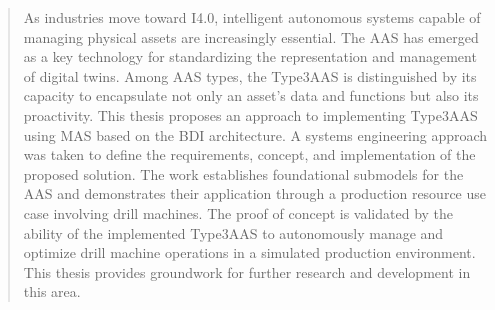 
\begin{abstract}

As industries move toward \ac{I4.0}, intelligent autonomous systems capable of managing physical assets are increasingly essential.
The \ac{AAS} has emerged as a key technology for standardizing the representation and management of digital twins.
Among AAS types, the \ac{Type3AAS} is distinguished by its capacity to encapsulate not only an asset's data and functions but also its proactivity.
This thesis proposes an approach to implementing \ac{Type3AAS} using \ac{MAS} based on the \ac{BDI} architecture.
A systems engineering approach was taken to define the requirements, concept, and implementation of the proposed solution.
The work establishes foundational submodels for the \ac{AAS} and demonstrates their application through a production resource use case involving drill machines.
The proof of concept is validated by the ability of the implemented \ac{Type3AAS} to autonomously manage and optimize drill machine operations in a simulated production environment.
This thesis provides groundwork for further research and development in this area.
\end{abstract}
